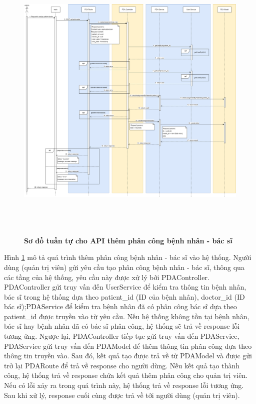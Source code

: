 \begin{figure}[H]
  \centering
  \includegraphics[width=16cm,height=14cm]{Images/sequence_api/addAssignment.png}
  \caption[Sơ đồ tuần tự cho API thêm phân công bệnh nhân - bác sĩ]{\bfseries \fontsize{12pt}{0pt}
  \selectfont Sơ đồ tuần tự cho API thêm phân công bệnh nhân - bác sĩ }
  \label{addPDA} %
\end{figure}
Hình \ref{addPDA} mô tả quá trình thêm phân công bệnh nhân - bác sĩ vào hệ thống. Người dùng (quản trị viên) gửi yêu cầu tạo phân công bệnh nhân - bác sĩ, thông qua các tầng của hệ thống, 
yêu cầu này được xử lý bởi PDAController. PDAController gửi truy vấn đến UserService để kiểm tra thông tin bệnh nhân, bác sĩ trong hệ thống dựa theo patient\_id (ID của bệnh nhân), doctor\_id (ID bác sĩ);PDAService để kiểm
tra bệnh nhân đã có phân công bác sĩ dựa theo patient\_id được truyền vào từ yêu cầu. Nếu hệ thống không tồn tại bệnh nhân, bác sĩ hay bệnh nhân đã có bác sĩ phân công, hệ thống sẽ trả về response lỗi tương ứng. 
Ngược lại, PDAController tiếp tục gửi truy vấn đến PDAService, PDAService gửi truy vấn đến PDAModel để thêm thông tin phân công dựa theo thông tin truyền vào. Sau đó, kết quả tạo được trả về từ PDAModel và được gửi trở lại 
PDARoute để trả về response cho người dùng. Nếu kết quả tạo thành công, hệ thống trả về response chứa kết quả thêm phân công cho quản trị viên. 
Nếu có lỗi xảy ra trong quá trình này, hệ thống trả về response lỗi tương ứng. Sau khi xử lý, response cuối cùng được trả về tới người dùng (quản trị viên).

